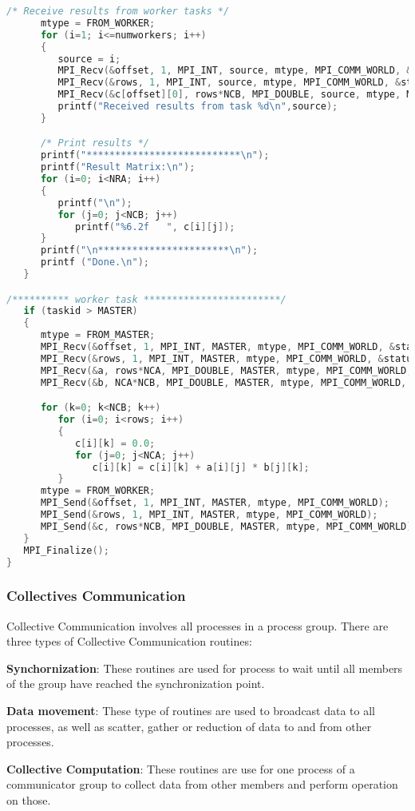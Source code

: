 \begin{lstlisting}[language=C, caption={An example of Matrix multiplication using MPI. \citep{Barney:16-mpi}}, label={lst:mpi_example}]
      /* Receive results from worker tasks */
      mtype = FROM_WORKER;
      for (i=1; i<=numworkers; i++)
      {
         source = i;
         MPI_Recv(&offset, 1, MPI_INT, source, mtype, MPI_COMM_WORLD, &status);
         MPI_Recv(&rows, 1, MPI_INT, source, mtype, MPI_COMM_WORLD, &status);
         MPI_Recv(&c[offset][0], rows*NCB, MPI_DOUBLE, source, mtype, MPI_COMM_WORLD, &status);
         printf("Received results from task %d\n",source);
      }

      /* Print results */
      printf("***************************\n");
      printf("Result Matrix:\n");
      for (i=0; i<NRA; i++)
      {
         printf("\n"); 
         for (j=0; j<NCB; j++) 
            printf("%6.2f   ", c[i][j]);
      }
      printf("\n***********************\n");
      printf ("Done.\n");
   }

/********** worker task ************************/
   if (taskid > MASTER)
   {
      mtype = FROM_MASTER;
      MPI_Recv(&offset, 1, MPI_INT, MASTER, mtype, MPI_COMM_WORLD, &status);
      MPI_Recv(&rows, 1, MPI_INT, MASTER, mtype, MPI_COMM_WORLD, &status);
      MPI_Recv(&a, rows*NCA, MPI_DOUBLE, MASTER, mtype, MPI_COMM_WORLD, &status);
      MPI_Recv(&b, NCA*NCB, MPI_DOUBLE, MASTER, mtype, MPI_COMM_WORLD, &status);

      for (k=0; k<NCB; k++)
         for (i=0; i<rows; i++)
         {
            c[i][k] = 0.0;
            for (j=0; j<NCA; j++)
               c[i][k] = c[i][k] + a[i][j] * b[j][k];
         }
      mtype = FROM_WORKER;
      MPI_Send(&offset, 1, MPI_INT, MASTER, mtype, MPI_COMM_WORLD);
      MPI_Send(&rows, 1, MPI_INT, MASTER, mtype, MPI_COMM_WORLD);
      MPI_Send(&c, rows*NCB, MPI_DOUBLE, MASTER, mtype, MPI_COMM_WORLD);
   }
   MPI_Finalize();
}
\end{lstlisting}

\subsubsection{Collectives Communication}
Collective Communication involves all processes in a process group. There are three types of Collective Communication routines:
\begin{description}
	\item \textbf{Synchornization}:
	These routines are used for process to wait until all members of the group have reached the synchronization point.
	\item \textbf{Data movement}:
	These type of routines are used to broadcast data to all processes, as well as scatter, gather or reduction of data to and from other processes.
	\item \textbf{Collective Computation}:
	These routines are use for one process of a communicator group to collect data from other members and perform operation on those.
\end{description}
\citep{Barney:16-mpi}

